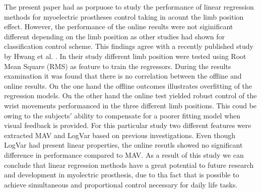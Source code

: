 The present paper had as porpuose to study the performance of linear regression methods for myoelectric prostheses control taking in acount the limb position effect. However, the performance of the online results were not siginificant different depending on the limb position as other studies had shown for classification control scheme. This findings agree with a recently published study by Hwang et al. \cite{Hwang2017}. In their study different limb position were tested using Root Mean Square (RMS) as feature to train the regressors.
During the results examination it was found that there is no correlation between the offline and online results. On the one hand the offline outcomes illustrates overfitting of the regression models. On the other hand the online test yielded robust control of the wrist movements performanced in the three different limb positions. This coud be owing to the subjects$'$ ability to compensate for a poorer fitting model when visual feedback is provided.
For this particular study two different features were extracted MAV and LogVar based on previous investigations. Even though LogVar had present linear properties, the online resutls showed no significant difference in performance compared to MAV. 
As a result of this study we can conclude that linear regression methods have a great potential to future research and development in myolectric prosthesis, due to tha fact that is possible to achieve simultaneous and proportional control necessary for daily life tasks. 
		
	

